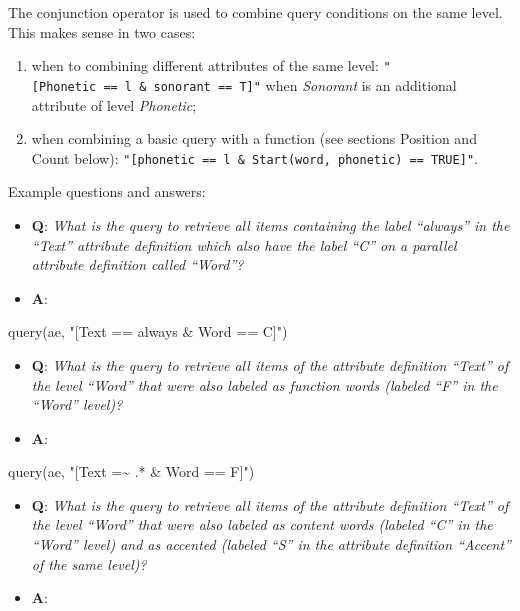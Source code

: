 \documentclass[
]{book}
\newenvironment{Shaded}{\begin{snugshade}}{\end{snugshade}}
\newcommand{\FunctionTok}[1]{\textcolor[rgb]{0.00,0.00,0.00}{#1}}
\newcommand{\NormalTok}[1]{#1}
\newcommand{\StringTok}[1]{\textcolor[rgb]{0.31,0.60,0.02}{#1}}
\providecommand{\tightlist}{%
  \setlength{\itemsep}{0pt}\setlength{\parskip}{0pt}}
\begin{document}
The conjunction operator is used to combine query conditions on the same level. This makes sense in two cases:

\begin{enumerate}
\def\labelenumi{\arabic{enumi}.}
\tightlist
\item
  when to combining different attributes of the same level: \texttt{"{[}Phonetic\ ==\ l\ \&\ sonorant\ ==\ T{]}"} when \emph{Sonorant} is an additional attribute of level \emph{Phonetic};
\item
  when combining a basic query with a function (see sections Position and Count below): \texttt{"{[}phonetic\ ==\ l\ \&\ Start(word,\ phonetic)\ ==\ TRUE{]}"}.
\end{enumerate}

Example questions and answers:

\begin{itemize}
\tightlist
\item
  \textbf{Q}: \emph{What is the query to retrieve all items containing the label ``always'' in the ``Text'' attribute definition which also have the label ``C'' on a parallel attribute definition called ``Word''?}
\item
  \textbf{A}:
\end{itemize}

\begin{Shaded}
\begin{Highlighting}[]
\FunctionTok{query}\NormalTok{(ae, }\StringTok{"[Text == always \& Word == C]"}\NormalTok{)}
\end{Highlighting}
\end{Shaded}

\begin{itemize}
\tightlist
\item
  \textbf{Q}: \emph{What is the query to retrieve all items of the attribute definition ``Text'' of the level ``Word'' that were also labeled as function words (labeled ``F'' in the ``Word'' level)?}
\item
  \textbf{A}:
\end{itemize}

\begin{Shaded}
\begin{Highlighting}[]
\FunctionTok{query}\NormalTok{(ae, }\StringTok{"[Text =\textasciitilde{} .* \& Word == F]"}\NormalTok{)}
\end{Highlighting}
\end{Shaded}

\begin{itemize}
\tightlist
\item
  \textbf{Q}: \emph{What is the query to retrieve all items of the attribute definition ``Text'' of the level ``Word'' that were also labeled as content words (labeled ``C'' in the ``Word'' level) and as accented (labeled ``S'' in the attribute definition ``Accent'' of the same level)?}
\item
  \textbf{A}:
\end{itemize}
\end{document}
